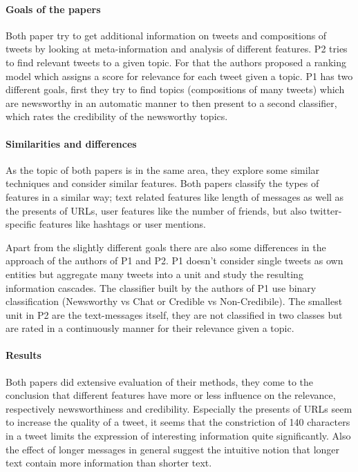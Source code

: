 \documentclass{proseminar}
\begin{document}
\paragraph{Goals of the papers}
Both paper try to get additional information on tweets and compositions of tweets by looking at meta-information and analysis of different features.
P2 tries to find relevant tweets to a given topic. For that the authors proposed a ranking model which assigns a score for relevance for each tweet given a topic.
P1 has two different goals, first they try to find topics (compositions of many tweets) which are newsworthy in an automatic manner to then present to a second classifier, which rates the credibility of the newsworthy topics.

\paragraph{Similarities and differences}
As the topic of both papers is in the same area, they explore some similar techniques and consider similar features. Both papers classify the types of features in a similar way; text related features like length of messages as well as the presents of URLs, user features like the number of friends, but also twitter-specific features like hashtags or user mentions.

Apart from the slightly different goals there are also some differences in the approach of the authors of P1 and P2. P1 doesn't consider single tweets as own entities but aggregate many tweets into a unit and study the resulting information cascades. The classifier built by the authors of P1 use binary classification (Newsworthy vs Chat or Credible vs Non-Credibile).
The smallest unit in P2 are the text-messages itself, they are not classified in two classes but are rated in a continuously manner for their relevance given a topic.

\paragraph{Results}
Both papers did extensive evaluation of their methods, they come to the conclusion that different features have more or less influence on the relevance, respectively newsworthiness and credibility. Especially the presents of URLs seem to increase the quality of a tweet, it seems that the constriction of 140 characters in a tweet limits the expression of interesting information quite significantly. Also the effect of longer messages in general suggest the intuitive notion that longer text contain more information than shorter text.
\end{document}
